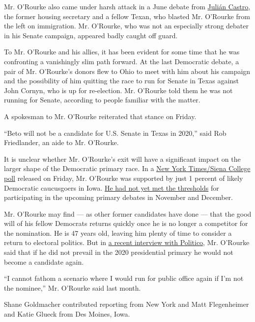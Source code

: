 Mr. O'Rourke also came under harsh attack in a June debate from
\href{https://www.nytimes.com/interactive/2020/us/elections/julian-castro.html}{Julián
Castro}, the former housing secretary and a fellow Texan, who blasted
Mr. O'Rourke from the left on immigration. Mr. O'Rourke, who was not an
especially strong debater in his Senate campaign, appeared badly caught
off guard.

To Mr. O'Rourke and his allies, it has been evident for some time that
he was confronting a vanishingly slim path forward. At the last
Democratic debate, a pair of Mr. O'Rourke's donors flew to Ohio to meet
with him about his campaign and the possibility of him quitting the race
to run for Senate in Texas against John Cornyn, who is up for
re-election. Mr. O'Rourke told them he was not running for Senate,
according to people familiar with the matter.

A spokesman to Mr. O'Rourke reiterated that stance on Friday.

``Beto will not be a candidate for U.S. Senate in Texas in 2020,'' said
Rob Friedlander, an aide to Mr. O'Rourke.

It is unclear whether Mr. O'Rourke's exit will have a significant impact
on the larger shape of the Democratic primary race. In a
\href{https://www.nytimes.com/2019/11/01/us/politics/iowa-poll-warren-biden.html}{New
York Times/Siena College poll} released on Friday, Mr. O'Rourke was
supported by just 1 percent of likely Democratic caucusgoers in Iowa.
\href{https://www.nytimes.com/interactive/2019/us/politics/democratic-debate-lineup.html}{He
had not yet met the thresholds} for participating in the upcoming
primary debates in November and December.

Mr. O'Rourke may find --- as other former candidates have done --- that
the good will of his fellow Democrats returns quickly once he is no
longer a competitor for the nomination. He is 47 years old, leaving him
plenty of time to consider a return to electoral politics. But in
\href{https://www.politico.com/magazine/story/2019/10/15/beto-orourke-gun-debate-229849}{a
recent interview with Politico}, Mr. O'Rourke said that if he did not
prevail in the 2020 presidential primary he would not become a candidate
again.

``I cannot fathom a scenario where I would run for public office again
if I'm not the nominee,'' Mr. O'Rourke said last month.

Shane Goldmacher contributed reporting from New York and Matt
Flegenheimer and Katie Glueck from Des Moines, Iowa.

